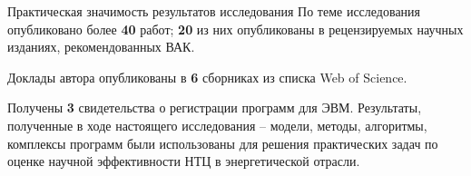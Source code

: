 \documentclass{beamer}
\begin{document}
\begin{frame}{Практическая значимость результатов исследования}
	По теме исследования опубликовано более \textbf{40} работ; \textbf{20} из них опубликованы в рецензируемых научных изданиях, рекомендованных ВАК. 
	
	Доклады автора опубликованы в \textbf{6} сборниках из списка Web of Science. 
	
	Получены \textbf{3} свидетельства о регистрации программ для ЭВМ.
	\linebreak
	\linebreak
	Результаты, полученные в ходе настоящего исследования – модели, методы, алгоритмы, комплексы программ были использованы для решения практических задач по оценке научной эффективности НТЦ в энергетической отрасли.
\end{frame}
\end{document}
